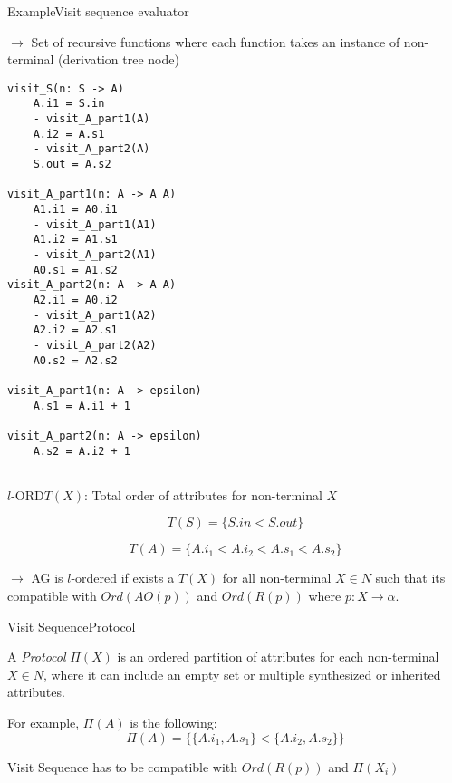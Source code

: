\begin{frame}[fragile=singleslide]{Example}{Visit sequence evaluator}

$\to$ Set of \alert{recursive functions} where each function takes an \alert{instance of non-terminal} (derivation tree node)

\begin{multicols}{2}
\begin{Verbatim}[fontsize=\scriptsize]
visit_S(n: S -> A)
    A.i1 = S.in
    - visit_A_part1(A)
    A.i2 = A.s1
    - visit_A_part2(A)
    S.out = A.s2

visit_A_part1(n: A -> A A)
    A1.i1 = A0.i1
    - visit_A_part1(A1)
    A1.i2 = A1.s1
    - visit_A_part2(A1)
    A0.s1 = A1.s2
visit_A_part2(n: A -> A A)
    A2.i1 = A0.i2
    - visit_A_part1(A2)
    A2.i2 = A2.s1
    - visit_A_part2(A2)
    A0.s2 = A2.s2

visit_A_part1(n: A -> epsilon)
    A.s1 = A.i1 + 1

visit_A_part2(n: A -> epsilon)
    A.s2 = A.i2 + 1
    
\end{Verbatim}
\end{multicols}
\end{frame}


\begin{frame}{$l$-ORD}{$T(X)$: Total order of attributes for non-terminal $X$ }

\[  T(S) = \{ S.\mathit{in} < S.\mathit{out}  \}  \]

\[  T(A) = \{ A.i_1 < A.i_2 < A.s_1 < A.s_2 \}  \]

\newlinevspace

$\to$ AG is $l$-ordered if exists a $T(X)$  for all non-terminal $X \in N$ such that its \alert{compatible} with $\mathit{Ord}(\mathit{AO}(p))$ and $\mathit{Ord}(R(p))$ where $p: X \rightarrow \alpha$. 

\end{frame}




\begin{frame}{Visit Sequence}{Protocol}

\begin{definition}
A \emph{Protocol} $\Pi(X)$ is an \alert{ordered partition of attributes} for each non-terminal $X \in N$, where it can include an empty set or multiple synthesized or inherited attributes.
\end{definition}

\newlinevspace

\begin{examples}
For example, $\Pi(A)$ is the following:
\[ \Pi(A) = \Big\{ \{ A.i_1, A.s_1 \} < \{ A.i_2, A.s_2 \} \Big\} \]
\end{examples}

Visit Sequence has to be compatible with $\mathit{Ord}(R(p))$ and $\Pi(X_i)$

\end{frame}


